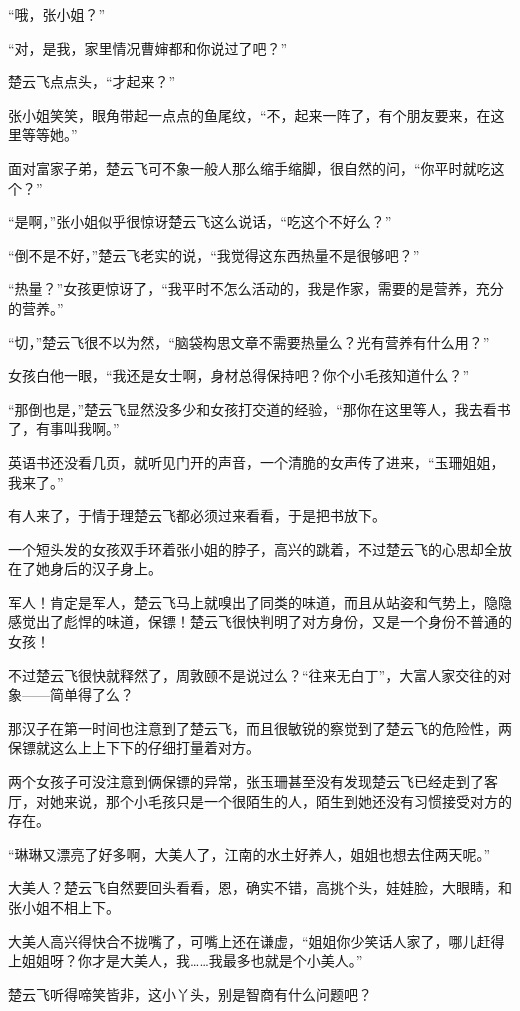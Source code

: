 “哦，张小姐？”

“对，是我，家里情况曹婶都和你说过了吧？”

楚云飞点点头，“才起来？”

张小姐笑笑，眼角带起一点点的鱼尾纹，“不，起来一阵了，有个朋友要来，在这里等等她。”

面对富家子弟，楚云飞可不象一般人那么缩手缩脚，很自然的问，“你平时就吃这个？”

“是啊，”张小姐似乎很惊讶楚云飞这么说话，“吃这个不好么？”

“倒不是不好，”楚云飞老实的说，“我觉得这东西热量不是很够吧？”

“热量？”女孩更惊讶了，“我平时不怎么活动的，我是作家，需要的是营养，充分的营养。”

“切，”楚云飞很不以为然，“脑袋构思文章不需要热量么？光有营养有什么用？”

女孩白他一眼，“我还是女士啊，身材总得保持吧？你个小毛孩知道什么？”

“那倒也是，”楚云飞显然没多少和女孩打交道的经验，“那你在这里等人，我去看书了，有事叫我啊。”

英语书还没看几页，就听见门开的声音，一个清脆的女声传了进来，“玉珊姐姐，我来了。”

有人来了，于情于理楚云飞都必须过来看看，于是把书放下。

一个短头发的女孩双手环着张小姐的脖子，高兴的跳着，不过楚云飞的心思却全放在了她身后的汉子身上。

军人！肯定是军人，楚云飞马上就嗅出了同类的味道，而且从站姿和气势上，隐隐感觉出了彪悍的味道，保镖！楚云飞很快判明了对方身份，又是一个身份不普通的女孩！

不过楚云飞很快就释然了，周敦颐不是说过么？“往来无白丁”，大富人家交往的对象——简单得了么？

那汉子在第一时间也注意到了楚云飞，而且很敏锐的察觉到了楚云飞的危险性，两保镖就这么上上下下的仔细打量着对方。

两个女孩子可没注意到俩保镖的异常，张玉珊甚至没有发现楚云飞已经走到了客厅，对她来说，那个小毛孩只是一个很陌生的人，陌生到她还没有习惯接受对方的存在。

“琳琳又漂亮了好多啊，大美人了，江南的水土好养人，姐姐也想去住两天呢。”

大美人？楚云飞自然要回头看看，恩，确实不错，高挑个头，娃娃脸，大眼睛，和张小姐不相上下。

大美人高兴得快合不拢嘴了，可嘴上还在谦虚，“姐姐你少笑话人家了，哪儿赶得上姐姐呀？你才是大美人，我……我最多也就是个小美人。”

楚云飞听得啼笑皆非，这小丫头，别是智商有什么问题吧？

